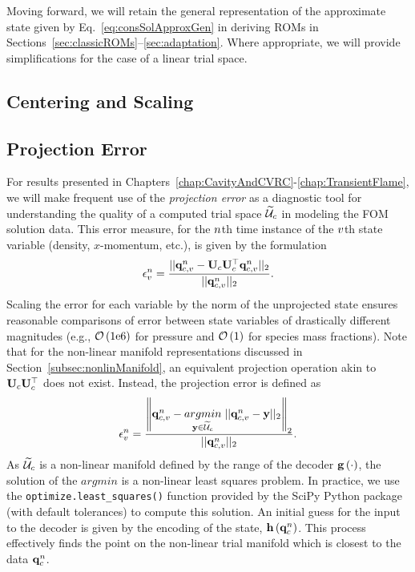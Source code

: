 Moving forward, we will retain the general representation of the approximate state given by Eq.~\ref{eq:consSolApproxGen} in deriving ROMs in Sections~\ref{sec:classicROMs}--\ref{sec:adaptation}. Where appropriate, we will provide simplifications for the case of a linear trial space.

\subsection{Centering and Scaling}\label{subsec:centerScale}


\subsection{Projection Error}\label{subsec:projError}

For results presented in Chapters~\ref{chap:CavityAndCVRC}-\ref{chap:TransientFlame}, we will make frequent use of the \textit{projection error} as a diagnostic tool for understanding the quality of a computed trial space $\consTrialSpace$ in modeling the FOM solution data. This error measure, for the $n$th time instance of the $v$th state variable (density, $x$-momentum, etc.), is given by the formulation
%
\begin{equation}
    \errVecVar^\timeIdx = \frac{|| \consVecVar^\timeIdx - \consTrial \consTrial^\top \consVecVar^\timeIdx ||_2}{|| \consVecVar^\timeIdx ||_2}.
\end{equation}
%
Scaling the error for each variable by the norm of the unprojected state ensures reasonable comparisons of error between state variables of drastically different magnitudes (e.g., $\mathcal{O}\left(1\text{e}6\right)$ for pressure and $\mathcal{O}\left(1\right)$ for species mass fractions). Note that for the non-linear manifold representations discussed in Section~\ref{subsec:nonlinManifold}, an equivalent projection operation akin to $\consTrial \consTrial^\top$ does not exist. Instead, the projection error is defined as
%
\begin{equation}
    \errVecVar^\timeIdx = \frac{\left\Vert \consVecVar^\timeIdx - \argmin{\dummyVec \in \consTrialSpace} ||\consVecVar^\timeIdx - \dummyVec||_2 \right\Vert_2}{|| \consVecVar^\timeIdx ||_2}.
\end{equation}
%
As $\consTrialSpace$ is a non-linear manifold defined by the range of the decoder $\mathbf{g} \left(\cdot\right)$, the solution of the $argmin$ is a non-linear least squares problem. In practice, we use the \verb|optimize.least_squares()| function provided by the SciPy Python package (with default tolerances) to compute this solution. An initial guess for the input to the decoder is given by the encoding of the state, $\mathbf{h} \left(\mathbf{q}_{c}^{n}\right)$. This process effectively finds the point on the non-linear trial manifold which is closest to the data $\mathbf{q}_{c}^{n}$.

